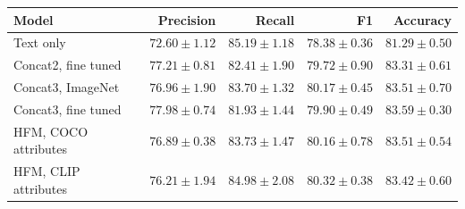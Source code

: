 \begin{tabular}{lrrrr}
\toprule
Model & Precision & Recall & F1 & Accuracy \\
\midrule
Text only & $72.60\pm1.12$ & $85.19\pm1.18$ & $78.38\pm0.36$ & $81.29\pm0.50$ \\
Concat2, fine tuned & $77.21\pm0.81$ & $82.41\pm1.90$ & $79.72\pm0.90$ & $83.31\pm0.61$ \\
Concat3, ImageNet & $76.96\pm1.90$ & $83.70\pm1.32$ & $80.17\pm0.45$ & $83.51\pm0.70$ \\
Concat3, fine tuned & $77.98\pm0.74$ & $81.93\pm1.44$ & $79.90\pm0.49$ & $83.59\pm0.30$ \\
HFM, COCO attributes & $76.89\pm0.38$ & $83.73\pm1.47$ & $80.16\pm0.78$ & $83.51\pm0.54$ \\
HFM, CLIP attributes & $76.21\pm1.94$ & $84.98\pm2.08$ & $80.32\pm0.38$ & $83.42\pm0.60$ \\
\bottomrule
\end{tabular}
